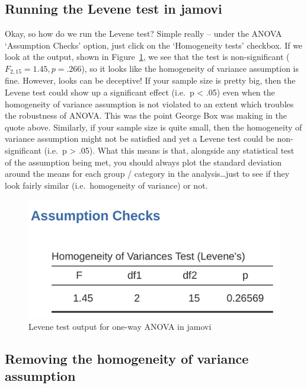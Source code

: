 \documentclass[
  a4paper,
]{book}
\begin{document}
\hypertarget{running-the-levene-test-in-jamovi}{%
\subsection{Running the Levene test in
jamovi}\label{running-the-levene-test-in-jamovi}}

Okay, so how do we run the Levene test? Simple really -- under the ANOVA
`Assumption Checks' option, just click on the `Homogeneity tests'
checkbox. If we look at the output, shown in Figure~\ref{fig-fig13-5},
we see that the test is non-significant (\(F_{2,15} = 1.45, p = .266\)),
so it looks like the homogeneity of variance assumption is fine.
However, looks can be deceptive! If your sample size is pretty big, then
the Levene test could show up a significant effect (i.e.~p \textless{}
.05) even when the homogeneity of variance assumption is not violated to
an extent which troubles the robustness of ANOVA. This was the point
George Box was making in the quote above. Similarly, if your sample size
is quite small, then the homogeneity of variance assumption might not be
satisfied and yet a Levene test could be non-significant (i.e.~p
\textgreater{} .05). What this means is that, alongside any statistical
test of the assumption being met, you should always plot the standard
deviation around the means for each group / category in the
analysis\ldots just to see if they look fairly similar (i.e.~homogeneity
of variance) or not.

\begin{figure}

\includegraphics[width=1\textwidth,height=\textheight]{images/fig13-5.png} \hfill{}

\caption{\label{fig-fig13-5}Levene test output for one-way ANOVA in
jamovi}

\end{figure}

\hypertarget{removing-the-homogeneity-of-variance-assumption}{%
\subsection{Removing the homogeneity of variance
assumption}\label{removing-the-homogeneity-of-variance-assumption}}
\end{document}
